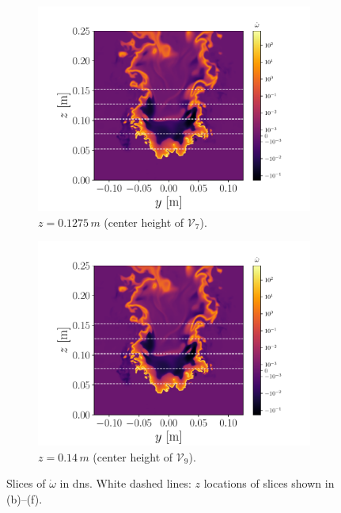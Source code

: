 \documentclass[review]{elsarticle}
\begin{document}
\begin{figure}[!tbp]
\begin{subfigure}[t]{0.48\textwidth}
    \includegraphics[page=5,width=\textwidth]{./figs/src_pv.pdf}%
    \caption{$z=0.1275\,\unit{m}$ (center height of $\mathcal{V}_{7}$).}%
  \end{subfigure}\hfill%
  \begin{subfigure}[t]{0.48\textwidth}%
    \includegraphics[page=6,width=\textwidth]{./figs/src_pv.pdf}%
    \caption{$z=0.14\,\unit{m}$ (center height of $\mathcal{V}_{9}$).}%
  \end{subfigure}
  \caption{Slices of $\dot{\omega}$ in \gls{dns}. White dashed lines: $z$ locations of slices shown in (b)--(f).}\label{fig:dns}%
\end{figure}%
\end{document}
